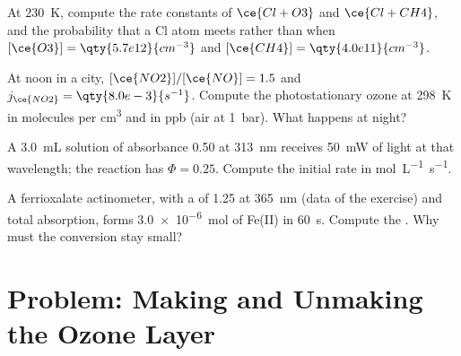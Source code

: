 \begin{exercise}[$\star\star$]\label{exo:b3:photochemistry:9}
At \qty{230}{K}, compute the rate constants of $\ce{Cl + O3}$ and $\ce{Cl + CH4}$, and the
probability that a Cl atom meets  rather than  when $[\ce{O3}] = \qty{5.7e12}{cm^{-3}}$
and $[\ce{CH4}] = \qty{4.0e11}{cm^{-3}}$.
\end{exercise}

\begin{exercise}[$\star\star\star$]\label{exo:b3:photochemistry:10}
At noon in a city, $[\ce{NO2}]/[\ce{NO}] = 1.5$ and $j_{\ce{NO2}} = \qty{8.0e-3}{s^{-1}}$. Compute the
photostationary ozone at \qty{298}{K} in molecules per \unit{cm^3} and in ppb (air at \qty{1}{bar}).
What happens at night?
\end{exercise}

\begin{exercise}[$\star\star\star$]\label{exo:b3:photochemistry:11}
A \qty{3.0}{mL} solution of absorbance 0.50 at \qty{313}{nm} receives \qty{50}{mW} of
light at that wavelength; the reaction has $\Phi = 0.25$. Compute the initial rate in
\unit{mol.L^{-1}.s^{-1}}.
\end{exercise}

\begin{exercise}[$\star\star\star$]\label{exo:b3:photochemistry:12}
A ferrioxalate actinometer, with a  of 1.25 at \qty{365}{nm} (data of the
exercise) and total absorption, forms \qty{3.0e-6}{mol} of Fe(II) in \qty{60}{s}.
Compute the . Why must the conversion stay small?
\end{exercise}

\section{Problem: Making and Unmaking the Ozone Layer}

